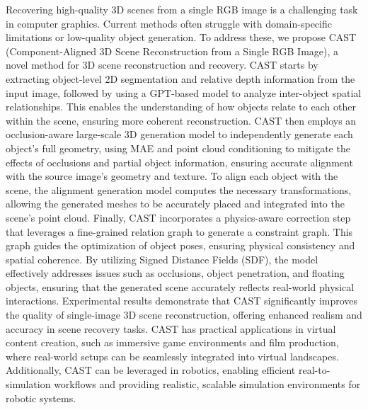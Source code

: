 Recovering high-quality 3D scenes from a single RGB image is a challenging task in computer graphics. Current methods often struggle with domain-specific limitations or low-quality object generation. To address these, we propose CAST (Component-Aligned 3D Scene Reconstruction from a Single RGB Image), a novel method for 3D scene reconstruction and recovery. CAST starts by extracting object-level 2D segmentation and relative depth information from the input image, followed by using a GPT-based model to analyze inter-object spatial relationships. This enables the understanding of how objects relate to each other within the scene, ensuring more coherent reconstruction. CAST then employs an occlusion-aware large-scale 3D generation model to independently generate each object's full geometry, using MAE and point cloud conditioning to mitigate the effects of occlusions and partial object information, ensuring accurate alignment with the source image's geometry and texture. To align each object with the scene, the alignment generation model computes the necessary transformations, allowing the generated meshes to be accurately placed and integrated into the scene's point cloud. Finally, CAST incorporates a physics-aware correction step that leverages a fine-grained relation graph to generate a constraint graph. This graph guides the optimization of object poses, ensuring physical consistency and spatial coherence. By utilizing Signed Distance Fields (SDF), the model effectively addresses issues such as occlusions, object penetration, and floating objects, ensuring that the generated scene accurately reflects real-world physical interactions. Experimental results demonstrate that CAST significantly improves the quality of single-image 3D scene reconstruction, offering enhanced realism and accuracy in scene recovery tasks. CAST has practical applications in virtual content creation, such as immersive game environments and film production, where real-world setups can be seamlessly integrated into virtual landscapes. Additionally, CAST can be leveraged in robotics, enabling efficient real-to-simulation workflows and providing realistic, scalable simulation environments for robotic systems.


